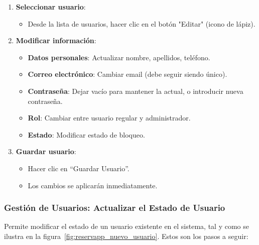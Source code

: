 \begin{enumerate}
   \item \textbf{Seleccionar usuario}:
   \begin{itemize}
      \item Desde la lista de usuarios, hacer clic en el botón "Editar" (icono de lápiz).
   \end{itemize}
   \item \textbf{Modificar información}:
   \begin{itemize}
      \item \textbf{Datos personales}: Actualizar nombre, apellidos, teléfono.
      \item \textbf{Correo electrónico}: Cambiar email (debe seguir siendo único).
	  \item \textbf{Contraseña}: Dejar vacío para mantener la actual, o introducir nueva contraseña.
	  \item \textbf{Rol}: Cambiar entre usuario regular y administrador.
	  \item \textbf{Estado}: Modificar estado de bloqueo.
   \end{itemize}
   \item \textbf{Guardar usuario}:
   \begin{itemize}
      \item Hacer clic en ``Guardar Usuario''.
	  \item Los cambios se aplicarán inmediatamente.
   \end{itemize}
\end{enumerate}

\subsubsection{Gestión de Usuarios: Actualizar el Estado de Usuario}
Permite modificar el estado de un usuario existente en el sistema, tal y como se ilustra en la figura~\ref{fig:reservapp_nuevo_usuario}. Estos son los pasos a seguir:

